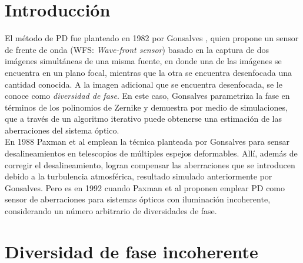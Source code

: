 \section{Introducción}
\label{sec:est_arte}


El método de PD fue planteado en 1982 por Gonsalves \cite{Gonsalves1982}, quien propone un sensor de frente de onda (WFS: \textit{Wave-front sensor}) basado en la captura de dos imágenes simultáneas de una misma fuente, en donde una de las imágenes se encuentra en un plano focal, mientras que la otra se encuentra desenfocada una cantidad conocida. A la imagen adicional que se encuentra desenfocada, se le conoce como \textit{diversidad de fase}. En este caso, Gonsalves parametriza la fase en términos de los polinomios de Zernike y demuestra por medio de simulaciones, que a través de un algoritmo iterativo puede obtenerse una estimación de las aberraciones del sistema óptico. \\

En 1988 Paxman et al \cite{Paxman1988} emplean la técnica planteada por  Gonsalves para sensar desalineamientos en telescopios de múltiples espejos deformables. Allí, además de corregir el desalineamiento, logran compensar las aberraciones que se introducen debido a la turbulencia atmosférica, resultado simulado anteriormente por Gonsalves. Pero es en 1992 cuando Paxman et al \cite{Paxman1992} proponen emplear PD como sensor de aberraciones para sistemas ópticos con iluminación incoherente, considerando un número arbitrario de diversidades de fase.%


\section{Diversidad de fase incoherente}
\label{sec:div_fase_trad}

